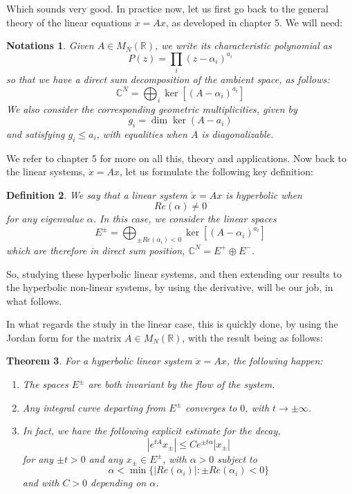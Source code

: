 \documentclass[12pt]{amsbook}
\newtheorem{theorem}{Theorem}[chapter]
\newtheorem{definition}[theorem]{Definition}
\newtheorem{notations}[theorem]{Notations}
\begin{document}
Which sounds very good. In practice now, let us first go back to the general theory of the linear equations $\dot{x}=Ax$, as developed in chapter 5. We will need:

\begin{notations}
Given $A\in M_N(\mathbb R)$, we write its characteristic polynomial as
$$P(z)=\prod_i(z-\alpha_i)^{a_i}$$
so that we have a direct sum decomposition of the ambient space, as follows:
$$\mathbb C^N=\bigoplus_i\ker\left[(A-\alpha_i)^{a_i}\right]$$
We also consider the corresponding geometric multiplicities, given by
$$g_i=\dim\ker(A-a_i)$$
and satisfying $g_i\leq a_i$, with equalities when $A$ is diagonalizable.
\end{notations}

We refer to chapter 5 for more on all this, theory and applications. Now back to the linear systems, $\dot{x}=Ax$, let us formulate the following key definition:

\begin{definition}
We say that a linear system $\dot{x}=Ax$ is hyperbolic when
$$Re(\alpha)\neq0$$
for any eigenvalue $\alpha$. In this case, we consider the linear spaces
$$E^\pm=\bigoplus_{\pm Re(\alpha_i)<0}\ker\left[(A-\alpha_i)^{a_i}\right]$$
which are therefore in direct sum position, $\mathbb C^N=E^+\oplus E^-$.
\end{definition}

So, studying these hyperbolic linear systems, and then extending our results to the hyperbolic non-linear systems, by using the derivative, will be our job, in what follows.

\bigskip

In what regards the study in the linear case, this is quickly done, by using the Jordan form for the matrix $A\in M_N(\mathbb R)$, with the result being as follows:

\begin{theorem}
For a hyperbolic linear system $\dot{x}=Ax$, the following happen:
\begin{enumerate}
\item The spaces $E^\pm$ are both invariant by the flow of the system.

\item Any integral curve departing from $E^\pm$ converges to $0$, with $t\to\pm\infty$.

\item In fact, we have the following explicit estimate for the decay,
$$|e^{tA}x_\pm|\leq Ce^{\pm t\alpha}|x_\pm|$$
for any $\pm t>0$ and any $x_\pm\in E^\pm$, with $\alpha>0$ subject to
$$\alpha<\min\Big\{|Re(\alpha_i)|:\pm Re(\alpha_i)<0\Big\}$$
and with $C>0$ depending on $\alpha$.
\end{enumerate}
\end{theorem}
\end{document}
